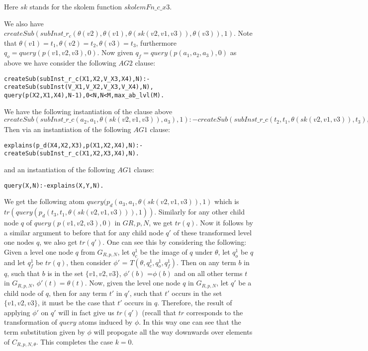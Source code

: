 \documentclass{article}
\begin{document}
Here $sk$ stands for the skolem function $skolemFn\_c\_x3$. 

We also have $createSub(subInst\_r_{c}(\theta(v2),\theta(v1),\theta(sk(v2,v1,v3)), \theta(v3)),1)$. Note that $\theta(v1)=t_{1},\theta(v2)=t_{2},\theta(v3)=t_{3}$, furthermore $q_{o}= query(p(v1,v2,v3),0)$. Now given $q_{f} = query(p(a_{1},a_{2},a_{3}),0)$ as above we have consider the following $AG2$ clause:\newline
\begin{verbatim}
createSub(subInst_r_c(X1,X2,V_X3,X4),N):-createSub(subInst(V_X1,V_X2,V_X3,V_X4),N),
query(p(X2,X1,X4),N-1),0<N,N<M,max_ab_lvl(M).    
\end{verbatim}
We have the following instantiation of the clause above\\
\newline
$createSub(subInst\_r\_c(a_{2},a_{1},\theta(sk(v2,v1,v3)),a_{3}),1):-createSub(subInst\_r\_c(t_{2},t_{1},\theta(sk(v2,v1,v3)),t_{3}),1),q_{f}.$\\
Then via an instantiation of the following $AG1$ clause:
\begin{verbatim}
explains(p_d(X4,X2,X3),p(X1,X2,X4),N):-createSub(subInst_r_c(X1,X2,X3,X4),N).    
\end{verbatim}
and an instantiation of the following $AG1$ clause:
\begin{verbatim}
query(X,N):-explains(X,Y,N).    
\end{verbatim}
We get the following atom $query(p_{d}(a_{3},a_{1},\theta(sk(v2,v1,v3)),1)$ which is $tr(query(p_{d}(t_{3},t_{1},\theta(sk(v2,v1,v3))),1))$. Similarly for any other child node $q$ of $query(p(v1,v2,v3),0)$ in $G{R,p,N}$, we get $tr(q)$. Now it follows by a similar argument to before that for any child node $q'$ of these transformed level one nodes $q$, we also get $tr(q')$. One can see this by considering the following: Given a level one node $q$ from $G_{R,p,N}$, let $q_{c}^{1}$ be the image of $q$ under $\theta$, let $q_{o}^{1}$ be $q$ and let $q_{f}^{1}$ be $tr(q)$, then consider $\phi'$ = $T(\theta, q_{c}^{1},q_{o}^{1},q_{f}^{1})$. Then on any term $b$ in $q$, such that $b$ is in the set $\{v1,v2,v3\}$, $\phi'(b)$ =$\phi(b)$ and on all other terms $t$ in $G_{R,p,N}$, $\phi'(t)=\theta(t)$. Now, given the level one node $q$ in $G_{R,p,N}$, let $q'$ be a child node of $q$, then for any term $t'$ in $q'$, such that $t'$ occurs in the set $\{v1,v2,v3\}$, it must be the case that $t'$ occurs in $q$. Therefore, the result of applying $\phi'$ on $q'$ will in fact give us $tr(q')$ (recall that $tr$ corresponds to the transformation of $query$ atoms induced by $\phi$. In this way one can see that the term substitution given by $\phi$ will propogate all the way downwards over elements of $C_{R,p,N,\theta}$. This completes the case $k=0$. 
\end{document}
